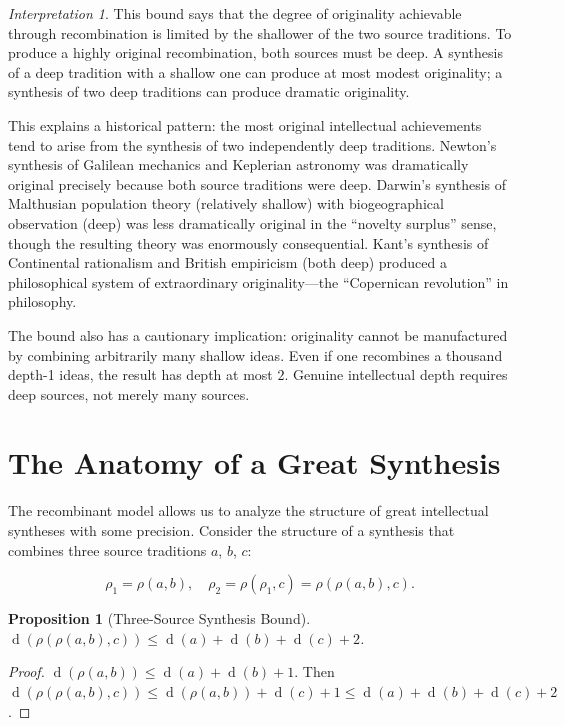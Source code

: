 \documentclass[11pt,openany]{book}
\theoremstyle{definition}
\theoremstyle{plain}
\newtheorem{proposition}[axiom]{Proposition}
\theoremstyle{remark}
\newtheorem{interpretation}[axiom]{Interpretation}
\newcommand{\depth}{\operatorname{d}}       %
\begin{document}
\begin{interpretation}
This bound says that the degree of originality achievable through recombination is limited by the shallower of the two source traditions. To produce a highly original recombination, both sources must be deep. A synthesis of a deep tradition with a shallow one can produce at most modest originality; a synthesis of two deep traditions can produce dramatic originality.

This explains a historical pattern: the most original intellectual achievements tend to arise from the synthesis of two independently deep traditions. Newton's synthesis of Galilean mechanics and Keplerian astronomy was dramatically original precisely because both source traditions were deep. Darwin's synthesis of Malthusian population theory (relatively shallow) with biogeographical observation (deep) was less dramatically original in the ``novelty surplus'' sense, though the resulting theory was enormously consequential. Kant's synthesis of Continental rationalism and British empiricism (both deep) produced a philosophical system of extraordinary originality---the ``Copernican revolution'' in philosophy.

The bound also has a cautionary implication: originality cannot be manufactured by combining arbitrarily many shallow ideas. Even if one recombines a thousand depth-1 ideas, the result has depth at most $2$. Genuine intellectual depth requires deep sources, not merely many sources.
\end{interpretation}

\section{The Anatomy of a Great Synthesis}

The recombinant model allows us to analyze the structure of great intellectual syntheses with some precision. Consider the structure of a synthesis that combines three source traditions $a$, $b$, $c$:

\[
\rho_1 = \rho(a, b), \quad \rho_2 = \rho(\rho_1, c) = \rho(\rho(a, b), c).
\]

\begin{proposition}[Three-Source Synthesis Bound]
$\depth(\rho(\rho(a, b), c)) \leq \depth(a) + \depth(b) + \depth(c) + 2$.
\end{proposition}

\begin{proof}
$\depth(\rho(a, b)) \leq \depth(a) + \depth(b) + 1$. Then $\depth(\rho(\rho(a, b), c)) \leq \depth(\rho(a, b)) + \depth(c) + 1 \leq \depth(a) + \depth(b) + \depth(c) + 2$.
\end{proof}
\end{document}
